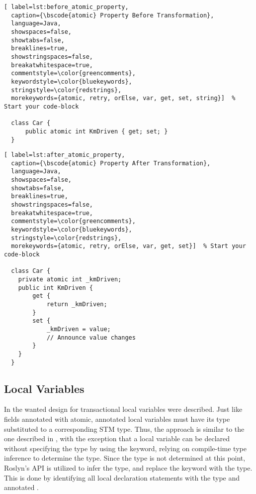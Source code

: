 \begin{lstlisting}[ label=lst:before_atomic_property,
  caption={\bscode{atomic} Property Before Transformation},
  language=Java,  
  showspaces=false,
  showtabs=false,
  breaklines=true,
  showstringspaces=false,
  breakatwhitespace=true,
  commentstyle=\color{greencomments},
  keywordstyle=\color{bluekeywords},
  stringstyle=\color{redstrings},
  morekeywords={atomic, retry, orElse, var, get, set, string}]  % Start your code-block

  class Car {
      public atomic int KmDriven { get; set; }
  }
\end{lstlisting}

\begin{lstlisting}[ label=lst:after_atomic_property,
  caption={\bscode{atomic} Property After Transformation},
  language=Java,  
  showspaces=false,
  showtabs=false,
  breaklines=true,
  showstringspaces=false,
  breakatwhitespace=true,
  commentstyle=\color{greencomments},
  keywordstyle=\color{bluekeywords},
  stringstyle=\color{redstrings},
  morekeywords={atomic, retry, orElse, var, get, set}]  % Start your code-block

  class Car {
    private atomic int _kmDriven;
    public int KmDriven {
        get {
            return _kmDriven;
        }
        set {
            _kmDriven = value;
            // Announce value changes
        }
    }
  }
\end{lstlisting}


\subsection{Local Variables}
In  the wanted design for transactional local variables were described. Just like fields annotated with atomic, annotated local variables must have its type substituted to a corresponding \ac{STM} type. Thus, the approach is similar to the one described in , with the exception that a local variable can be declared without specifying the type by using the  keyword, relying on compile-time type inference to determine the type. Since the type is not determined at this point, Roslyn's \ac{API} is utilized to infer the type, and replace the  keyword with the type. This is done by identifying all local declaration statements with the type  and annotated . 

